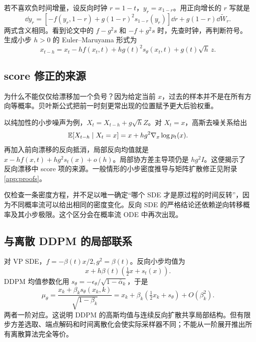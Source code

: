 若不喜欢负时间增量，设反向时钟 $r=1-t$，$y_r=x_{1-r}$。用正向增长的 $r$ 写就是
\begin{equation}
 \dd y_r=\left[-f(y_r,1-r)+g(1-r)^2s_{1-r}(y_r)\right]\dd r
 +g(1-r)\dd\widetilde W_r.
 \label{eq:reverse-clock}
\end{equation}
两式含义相同。看到论文中的 $f-g^2s$ 和 $-f+g^2s$ 时，先查时钟，再判断符号。生成小步 $h>0$ 的 Euler--Maruyama 形式为
\begin{equation}
 x_{t-h}=x_t-h f(x_t,t)+h g(t)^2s_\theta(x_t,t)
 +g(t)\sqrt h\,z.
 \label{eq:reverse-euler}
\end{equation}

\subsection{score 修正的来源}
为什么不能仅仅给漂移加一个负号？因为给定当前 $x$，过去的样本并不是在所有方向等概率。贝叶斯公式把前一时刻更常出现的位置赋予更大后验权重。

以纯加性的小步噪声为例，$X_t=X_{t-h}+g\sqrt h Z$。对 $X_t=x$，高斯去噪关系给出
\begin{equation}
 \mathbb{E}[X_{t-h}\mid X_t=x]=x+h g^2\nabla_x\log p_t(x).
\end{equation}
再加入前向漂移的反向抵消，局部反向均值就是
$x-hf(x,t)+hg^2s_t(x)+o(h)$。局部协方差主导项仍是 $hg^2I$。这便揭示了反向漂移中 score 项的来源。一般情形的小步密度推导与矩阵扩散修正见附录\ref{app:proofs}。

仅检查一条密度方程，并不足以唯一确定“哪个 SDE 才是原过程的时间反转”，因为不同概率流可以给出相同的密度变化。反向 SDE 的严格结论还依赖逆向转移概率及其小步极限。这个区分会在概率流 ODE 中再次出现。

\subsection{与离散 DDPM 的局部联系}
对 VP SDE，$f=-\beta(t)x/2,g^2=\beta(t)$。反向小步均值为
\begin{equation}
 x+h\beta(t)\left(\tfrac12x+s_t(x)\right).
\end{equation}
DDPM 均值参数化用 $s_\theta=-\epsilon_\theta/\sqrt{1-\bar\alpha_k}$，于是
\begin{equation}
 \mu_\theta=\frac{x_k+\beta_k s_\theta(x_k,k)}{\sqrt{1-\beta_k}}
 =x_k+\beta_k\left(\tfrac12x_k+s_\theta\right)+O(\beta_k^2).
\end{equation}
两者一阶对应。这说明 DDPM 的高斯均值与连续反向扩散共享局部结构。但有限步方差选取、端点解码和时间离散化会使实际采样器不同；不能从一阶展开推出所有离散算法完全等价。

